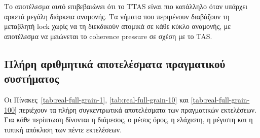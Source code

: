 \documentclass{article}
\begin{document}
Το αποτέλεσμα αυτό επιβεβαιώνει ότι το TTAS είναι πιο κατάλληλο όταν υπάρχει αρκετά μεγάλη διάρκεια αναμονής. Τα νήματα που περιμένουν διαβάζουν τη μεταβλητή lock χωρίς να τη διεκδικούν ατομικά σε κάθε κύκλο αναμονής, με αποτέλεσμα να μειώνεται το coherence pressure σε σχέση με το TAS.

\subsection{Πλήρη αριθμητικά αποτελέσματα πραγματικού συστήματος}

Οι Πίνακες~\ref{tab:real-full-grain-1}, \ref{tab:real-full-grain-10} και \ref{tab:real-full-grain-100} περιέχουν τα πλήρη συγκεντρωτικά αποτελέσματα των πραγματικών εκτελέσεων. Για κάθε περίπτωση δίνονται η διάμεσος, ο μέσος όρος, η ελάχιστη, η μέγιστη και η τυπική απόκλιση των πέντε εκτελέσεων.
\end{document}
